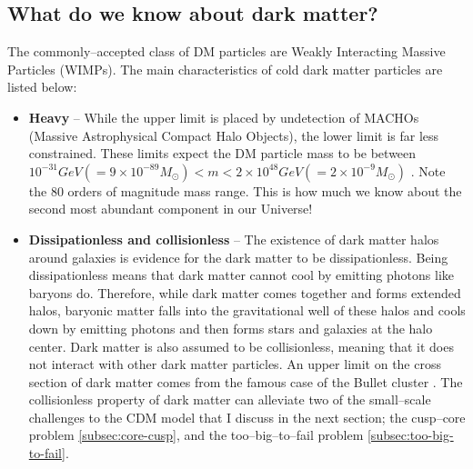 \documentclass[paper=a4, fontsize=11pt]{scrartcl} %
\numberwithin{equation}{section} %
\numberwithin{figure}{section} %
\numberwithin{table}{section} %
\newcommand{\ignore}[1]{}
\begin{document}
\subsection{What do we know about dark matter?}
\label{subsec:current state}
The commonly--accepted class of DM particles are Weakly Interacting Massive Particles (WIMPs). The main characteristics of %
cold dark matter particles are listed below:
  \begin{itemize}
  \item {\bf Heavy} -- \ignore{The observational upper and lower bounds for dark matter particles come from different sources. }While the upper limit is placed by undetection of MACHOs (Massive Astrophysical Compact Halo Objects), the lower limit is far less constrained.\ignore{ Neither the Kepler satellite \citep[][]{Griest+2014}, nor microlensing surveys \citep[][]{Alcock+1998, Yoo+2004} did not detect MACHOs as predicted.} These limits expect the DM particle mass to be between $10^\mathrm{-31} GeV (= 9\times 10^\mathrm{-89} M_\odot) < m < 2\times 10^\mathrm{48} GeV (= 2 \times 10^\mathrm{-9} M_\odot)$ \citep[\ignore{47 for lower bound}][\ignore{ and 42 \& 43 for the upper bound}]{Hu+2000, Alcock+1998, Yoo+2004}. Note the 80 orders of magnitude mass range. This is how much we know about the second most abundant component in our Universe!
  \item {\bf Dissipationless and collisionless} -- The existence of dark matter halos around galaxies is evidence for the dark matter to be dissipationless. Being dissipationless means that dark matter cannot cool by emitting photons like baryons do. Therefore, while dark matter comes together and forms extended halos, baryonic matter falls into the gravitational well of these halos and cools down by emitting photons and then forms stars and galaxies at the halo center. Dark matter is also assumed to be collisionless, meaning that it does not interact with other dark matter particles. An upper limit on the cross section of dark matter comes from the famous case of the Bullet cluster \citep[][]{Clowe+2006}. The collisionless property of dark matter can alleviate two of the small--scale challenges to the CDM model that I discuss in the next section; the cusp--core problem \ref{subsec:core-cusp}, and the too--big--to--fail problem \ref{subsec:too-big-to-fail}.


\end{itemize}
\end{document}

